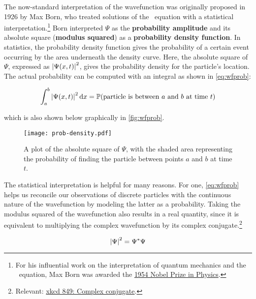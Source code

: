 The now-standard interpretation of the wavefunction was originally proposed in 1926 by Max Born, who treated solutions of the \Sch\ equation with a statistical interpretation.\footnote{For his influential work on the interpretation of quantum mechanics and the \Sch\ equation, Max Born was awarded the \href{https://www.nobelprize.org/prizes/physics/1954/summary/}{1954 Nobel Prize in Physics}.} 
Born interpreted $\Psi$ as the \textbf{probability amplitude} and its absolute square (\textbf{modulus squared}) as a \textbf{probability density function}. 
In statistics, the probability density function gives the probability of a certain event occurring by the area underneath the density curve. 
Here, the absolute square of $\Psi$, expressed as $\abs{\Psi(x,t)}^2$, gives the probability density for the particle's location. 
The actual probability can be computed with an integral as shown in \autoref{eq:wfprob}:

\begin{tcolorbox}[title=Born's statistical interpretation of $\Psi$] \vspace{-2ex}
	\begin{equation}
		\int_a^b \abs{\Psi(x,t)}^2 \dd{x} = \mathbb{P}\text{(particle is between $a$ and $b$ at time $t$)} \label{eq:wfprob}
	\end{equation}
\end{tcolorbox}

\noindent which is also shown below graphically in \autoref{fig:wfprob}.

\begin{figure}[!h]
	\centering
	\texttt{[image: prob-density.pdf]}
	\caption{A plot of the absolute square of $\Psi$, with the shaded area representing the probability of finding the particle between points $a$ and $b$ at time $t$.}
	\label{fig:wfprob}
\end{figure}

The statistical interpretation is helpful for many reasons. 
For one, \autoref{eq:wfprob} helps us reconcile our observations of discrete particles with the continuous nature of the wavefunction by modeling the latter as a probability. 
Taking the modulus squared of the wavefunction also results in a real quantity, since it is equivalent to multiplying the complex wavefunction by its complex conjugate.\footnote{Relevant: \href{https://xkcd.com/849/}{xkcd 849: Complex conjugate}.}

\begin{tcolorbox}[title=Key point: modulus squared of a complex number] \vspace{-2ex}
	\begin{equation}
		\abs{\Psi}^2 = \Psi^*\Psi
	\end{equation}
\end{tcolorbox}

